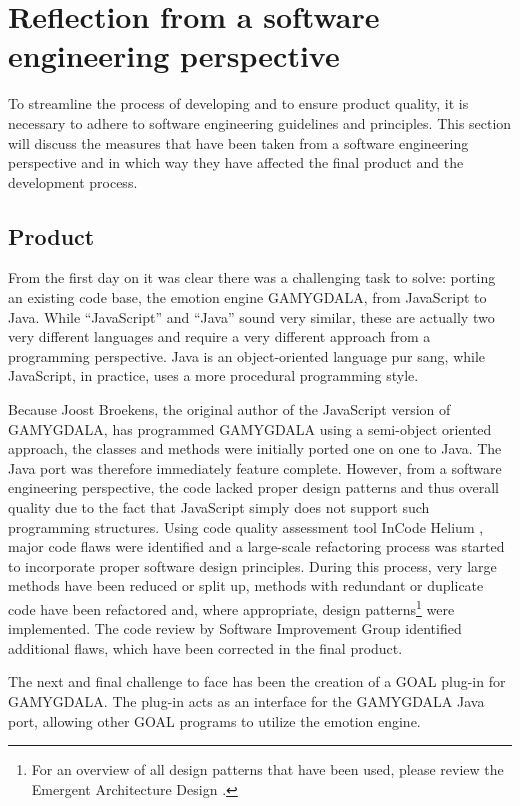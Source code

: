 \section{Reflection from a software engineering perspective}
\label{sec:reflection}
To streamline the process of developing and to ensure product quality, it is necessary to adhere to software engineering guidelines and principles. This section will discuss the measures that have been taken from a software engineering perspective and in which way they have affected the final product and the development process.


\subsection{Product}
From the first day on it was clear there was a challenging task to solve: porting an existing code base, the emotion engine GAMYGDALA, from JavaScript to Java. While ``JavaScript'' and ``Java'' sound very similar, these are actually two very different languages and require a very different approach from a programming perspective. Java is an object-oriented language pur sang, while JavaScript, in practice, uses a more procedural programming style.

Because Joost Broekens, the original author of the JavaScript version of GAMYGDALA, has programmed GAMYGDALA using a semi-object oriented approach, the classes and methods were initially ported one on one to Java. The Java port was therefore immediately feature complete. However, from a software engineering perspective, the code lacked proper design patterns and thus overall quality due to the fact that JavaScript simply does not support such  programming structures. Using code quality assessment tool InCode Helium \citep{incode}, major code flaws were identified and a large-scale refactoring process was started to incorporate proper software design principles. During this process, very large methods have been reduced or split up, methods with redundant or duplicate code have been refactored and, where appropriate, design patterns\footnote{For an overview of all design patterns that have been used, please review the Emergent Architecture Design \citep{ead}.} were implemented. The code review by Software Improvement Group \citep{SIG} identified additional flaws, which have been corrected in the final product.

The next and final challenge to face has been the creation of a GOAL \citep{goal} plug-in for GAMYGDALA. The plug-in acts as an interface for the GAMYGDALA Java port, allowing other GOAL programs to utilize the emotion engine.

